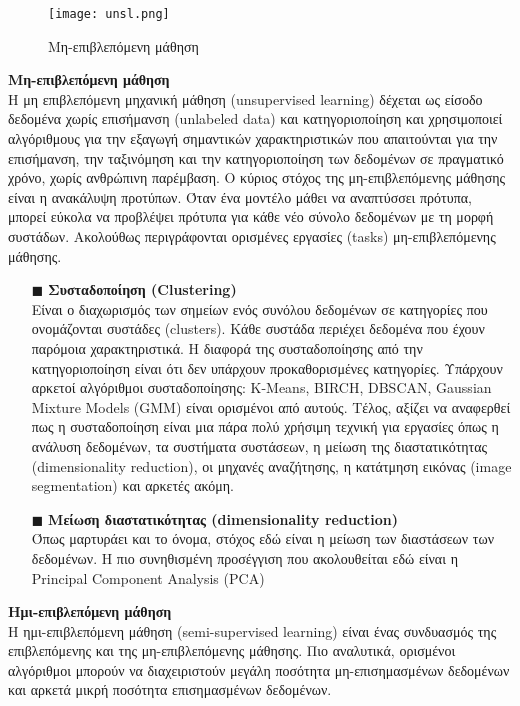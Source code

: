 \begin{figure}[H]
	\centering
	\texttt{[image: unsl.png]}
	\caption{Μη-επιβλεπόμενη μάθηση}
	\label{fig:unsl}
\end{figure}


\noindent\textbf{Μη-επιβλεπόμενη μάθηση}\\
Η μη επιβλεπόμενη μηχανική μάθηση (unsupervised learning) δέχεται ως είσοδο δεδομένα χωρίς επισήμανση (unlabeled data) και κατηγοριοποίηση και χρησιμοποιεί αλγόριθμους για την εξαγωγή σημαντικών χαρακτηριστικών που απαιτούνται για την επισήμανση, την ταξινόμηση και την κατηγοριοποίηση των δεδομένων σε πραγματικό χρόνο, χωρίς ανθρώπινη παρέμβαση. Ο κύριος στόχος της μη-επιβλεπόμενης μάθησης είναι η ανακάλυψη προτύπων. Όταν ένα μοντέλο μάθει να αναπτύσσει πρότυπα, μπορεί εύκολα να προβλέψει πρότυπα για κάθε νέο σύνολο δεδομένων με τη μορφή συστάδων. Ακολούθως περιγράφονται ορισμένες εργασίες (tasks) μη-επιβλεπόμενης μάθησης.
\begin{itemize}
	\item[$\blacksquare$] \noindent\textbf{Συσταδοποίηση (Clustering)}\\
Είναι ο διαχωρισμός των σημείων ενός συνόλου δεδομένων σε κατηγορίες που ονομάζονται συστάδες (clusters).  Κάθε συστάδα περιέχει δεδομένα που έχουν παρόμοια χαρακτηριστικά. Η διαφορά της συσταδοποίησης από την κατηγοριοποίηση είναι ότι δεν υπάρχουν προκαθορισμένες κατηγορίες. Υπάρχουν αρκετοί αλγόριθμοι συσταδοποίησης: K-Means, BIRCH, DBSCAN, Gaussian Mixture Models (GMM) είναι ορισμένοι από αυτούς. Τέλος, αξίζει να αναφερθεί πως η συσταδοποίηση είναι μια πάρα πολύ χρήσιμη τεχνική για εργασίες όπως η ανάλυση δεδομένων, τα συστήματα συστάσεων, η μείωση της διαστατικότητας (dimensionality reduction), οι μηχανές αναζήτησης, η κατάτμηση εικόνας (image segmentation) και αρκετές ακόμη.
\item[$\blacksquare$] \textbf{Μείωση διαστατικότητας (dimensionality reduction)}\\
Όπως μαρτυράει και το όνομα, στόχος εδώ είναι η μείωση των διαστάσεων των δεδομένων. Η πιο συνηθισμένη προσέγγιση που ακολουθείται εδώ είναι η Principal Component Analysis (PCA)

\end{itemize}


\noindent\textbf{Ημι-επιβλεπόμενη μάθηση}\\
Η ημι-επιβλεπόμενη μάθηση (semi-supervised learning) είναι ένας συνδυασμός της επιβλεπόμενης και της μη-επιβλεπόμενης μάθησης. Πιο αναλυτικά, ορισμένοι αλγόριθμοι μπορούν να διαχειριστούν μεγάλη ποσότητα μη-επισημασμένων δεδομένων και αρκετά μικρή ποσότητα επισημασμένων δεδομένων. \\


